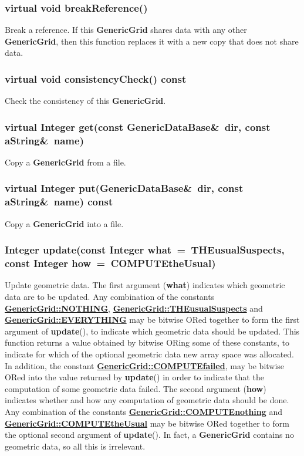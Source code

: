 \documentclass{article}
\begin{document}
  \subsubsection{virtual void breakReference()}
  \label{GenericGrid::breakReference()}
    Break a reference.  If this \textbf{GenericGrid} shares data with any other \textbf{GenericGrid},
    then this function replaces it with a new copy that does not share data.
  \subsubsection{virtual void consistencyCheck() const}
  \label{GenericGrid::consistencyCheck() const}
    Check the consistency of this \textbf{GenericGrid}.
  \subsubsection{virtual Integer get(const GenericDataBase\&~dir, const aString\&~name)}
  \label{GenericGrid::get(dir,name)}
    Copy a \textbf{GenericGrid} from a file.
  \subsubsection{virtual Integer put(GenericDataBase\&~dir, const aString\&~name) const}
  \label{GenericGrid::put(dir,name) const}
    Copy a \textbf{GenericGrid} into a file.
  \subsubsection{Integer update(const Integer what~=~THEusualSuspects, const Integer how~=~COMPUTEtheUsual)}
  \label{GenericGrid::update(what,how)}
    Update geometric data.
    The first argument (\textbf{what}) indicates which geometric data are to be updated.  Any combination of the constants
    {\bf{}\hyperref{NOTHING}{NOTHING \rm(\S}{)}{GenericGrid::NOTHING}},
    {\bf{}\hyperref{THEusualSuspects}{THEusualSuspects \rm(\S}{)}{GenericGrid::THEusualSuspects}} and
    {\bf{}\hyperref{EVERYTHING}{EVERYTHING \rm(\S}{)}{GenericGrid::EVERYTHING}}
    may be bitwise ORed together to form the first argument of \textbf{update}(), to indicate which geometric data should be updated.
    This function returns a value obtained by bitwise ORing some of these constants,
    to indicate for which of the optional geometric data new array space was allocated.
    In addition, the constant
    {\bf{}\hyperref{COMPUTEfailed}{COMPUTEfailed \rm(\S}{)}{GenericGrid::COMPUTEfailed}},
    may be bitwise ORed into the value returned by \textbf{update}() in order to indicate
    that the computation of some geometric data failed.  The second argument (\textbf{how})
    indicates whether and how any computation of geometric data should be done.
    Any combination of the constants
    {\bf{}\hyperref{COMPUTEnothing}{COMPUTEnothing \rm(\S}{)}{GenericGrid::COMPUTEnothing}} and
    {\bf{}\hyperref{COMPUTEtheUsual}{COMPUTEtheUsual \rm(\S}{)}{GenericGrid::COMPUTEtheUsual}}
    may be bitwise ORed together to form the optional second argument of \textbf{update}().
    In fact, a \textbf{GenericGrid} contains no geometric data, so all this is irrelevant.
\end{document}
